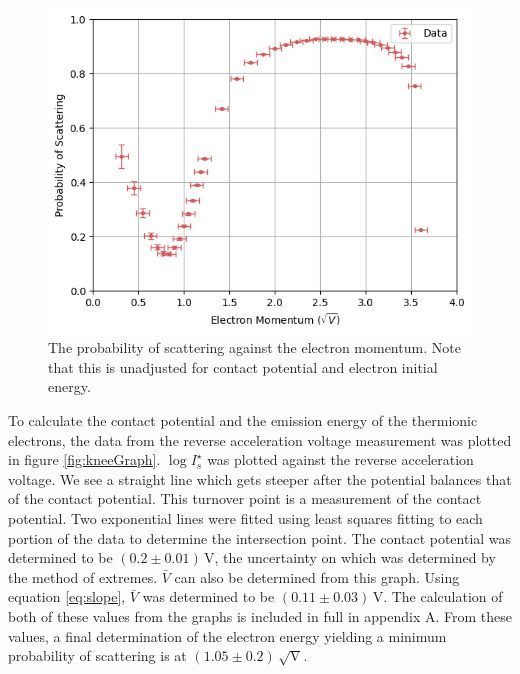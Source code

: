\documentclass[%
reprint,
amsmath,amssymb,
aps,
floatfix
]{revtex4-2}
\begin{document}
	\begin{figure}
		\includegraphics[width=\columnwidth]{probabilityOfScattering.png}
		\caption{\label{fig:probabilityOfScattering}The probability of scattering against the electron momentum. Note that this is unadjusted for contact potential and electron initial energy.}
	\end{figure}
	
	To calculate the contact potential and the emission energy of the thermionic electrons, the data from the reverse acceleration voltage measurement was plotted in figure \ref{fig:kneeGraph}. $\log{I_s^\star}$ was plotted against the reverse acceleration voltage. We see a straight line which gets steeper after the potential balances that of the contact potential. This turnover point is a measurement of the contact potential. Two exponential lines were fitted using least squares fitting to each portion of the data to determine the intersection point. The contact potential was determined to be $(0.2 \pm 0.01) \,\text{V}$, the uncertainty on which was determined by the method of extremes. $\bar{V}$ can also be determined from this graph. Using equation \ref{eq:slope}, $\bar{V}$ was determined to be $(0.11 \pm 0.03) \,\text{V}$. The calculation of both of these values from the graphs is included in full in appendix A. From these values, a final determination of the electron energy yielding a minimum probability of scattering is at $(1.05 \pm 0.2) \,\sqrt{\text{V}}$.
	
\end{document}
